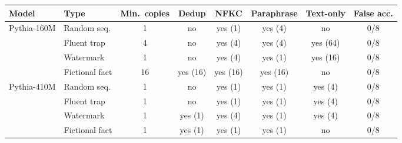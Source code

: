 \begin{tabular}{llcccccc}
\toprule
Model & Type & Min.\ copies & Dedup & NFKC & Paraphrase & Text-only & False acc. \\
\midrule
Pythia-160M & Random seq. & 1 & no & yes (1) & yes (4) & no & 0/8 \\
 & Fluent trap & 4 & no & yes (4) & yes (4) & yes (64) & 0/8 \\
 & Watermark & 1 & no & yes (4) & yes (1) & yes (16) & 0/8 \\
 & Fictional fact & 16 & yes (16) & yes (16) & yes (16) & no & 0/8 \\
\midrule
Pythia-410M & Random seq. & 1 & no & yes (1) & yes (1) & yes (4) & 0/8 \\
 & Fluent trap & 1 & no & yes (1) & yes (1) & yes (4) & 0/8 \\
 & Watermark & 1 & yes (1) & yes (4) & yes (1) & yes (4) & 0/8 \\
 & Fictional fact & 1 & yes (1) & yes (1) & yes (1) & no & 0/8 \\
\bottomrule
\end{tabular}
